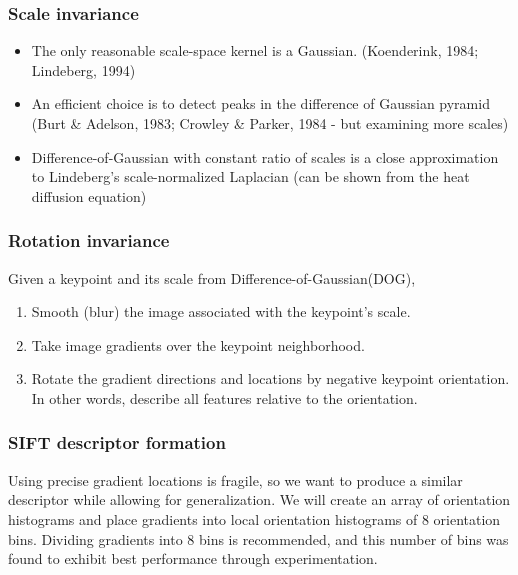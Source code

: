 \documentclass{article}
\begin{document}
\subsubsection{Scale invariance}
\begin{itemize}
  \item The only reasonable scale-space kernel is a Gaussian. (Koenderink, 1984; Lindeberg, 1994)
  \item An efficient choice is to detect peaks in the difference of Gaussian pyramid (Burt \& Adelson, 1983; Crowley \& Parker, 1984 - but examining more scales)
  \item Difference-of-Gaussian with constant ratio of scales is a close approximation to Lindeberg's scale-normalized Laplacian (can be shown from the heat diffusion equation)
\end{itemize}

\subsubsection{Rotation invariance}
Given a keypoint and its scale from Difference-of-Gaussian(DOG),
\begin{enumerate}
  \item Smooth (blur) the image associated with the keypoint's scale.
  \item Take image gradients over the keypoint neighborhood.
  \item Rotate the gradient directions and locations by negative keypoint orientation. In other words, describe all features relative to the orientation.
\end{enumerate}

\subsubsection{SIFT descriptor formation}
Using precise gradient locations is fragile, so we want to produce a similar descriptor while allowing for generalization. We will create an array of orientation histograms and place gradients into local orientation histograms of 8 orientation bins. Dividing gradients into 8 bins is recommended, and this number of bins was found to exhibit best performance through experimentation. 
\end{document}
